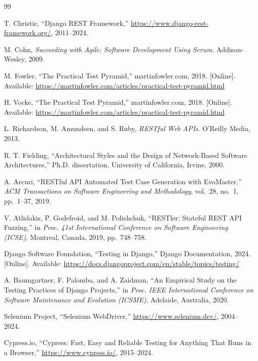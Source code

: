 \documentclass[12pt, a4paper]{article}
\begin{document}

\begin{thebibliography}{99}

T. Christie, ``Django REST Framework,''
\url{https://www.django-rest-framework.org/}, 2011--2024.

M. Cohn, \textit{Succeeding with Agile: Software Development Using Scrum}.
Addison-Wesley, 2009.

M. Fowler, ``The Practical Test Pyramid,'' martinfowler.com, 2018.
[Online]. Available: \url{https://martinfowler.com/articles/practical-test-pyramid.html}

H. Vocke, ``The Practical Test Pyramid,'' martinfowler.com, 2018.
[Online]. Available: \url{https://martinfowler.com/articles/practical-test-pyramid.html}

L. Richardson, M. Amundsen, and S. Ruby, \textit{RESTful Web APIs}.
O'Reilly Media, 2013.

R. T. Fielding, ``Architectural Styles and the Design of Network-Based
Software Architectures,'' Ph.D. dissertation, University of California,
Irvine, 2000.

A. Arcuri, ``RESTful API Automated Test Case Generation with EvoMaster,''
\textit{ACM Transactions on Software Engineering and Methodology}, vol.~28,
no.~1, pp.~1--37, 2019.

V. Atlidakis, P. Godefroid, and M. Polishchuk,
``RESTler: Stateful REST API Fuzzing,''
in \textit{Proc. 41st International Conference on Software Engineering (ICSE)},
Montreal, Canada, 2019, pp.~748--758.

Django Software Foundation, ``Testing in Django,''
Django Documentation, 2024.
[Online]. Available: \url{https://docs.djangoproject.com/en/stable/topics/testing/}

A. Baumgartner, F. Palomba, and A. Zaidman,
``An Empirical Study on the Testing Practices of Django Projects,''
in \textit{Proc. IEEE International Conference on Software Maintenance
and Evolution (ICSME)}, Adelaide, Australia, 2020.

Selenium Project, ``Selenium WebDriver,''
\url{https://www.selenium.dev/}, 2004--2024.

Cypress.io, ``Cypress: Fast, Easy and Reliable Testing for Anything That
Runs in a Browser,'' \url{https://www.cypress.io/}, 2015--2024.


\end{thebibliography}
\end{document}
